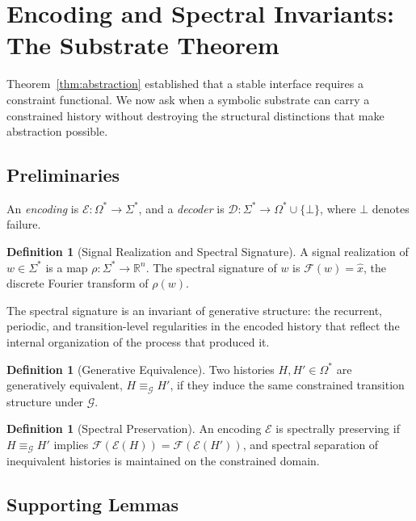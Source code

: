 \documentclass[12pt, a4paper]{article}
\theoremstyle{plain}
\theoremstyle{definition}
\newtheorem{definition}[theorem]{Definition}
\theoremstyle{remark}
\begin{document}
\section{Encoding and Spectral Invariants: The Substrate Theorem}

Theorem~\ref{thm:abstraction} established that a stable interface requires a constraint functional. We now ask when a symbolic substrate can carry a constrained history without destroying the structural distinctions that make abstraction possible.

\subsection{Preliminaries}

An \emph{encoding} is $\mathcal{E} : \Omega^* \to \Sigma^*$, and a \emph{decoder} is $\mathcal{D} : \Sigma^* \to \Omega^* \cup \{\bot\}$, where $\bot$ denotes failure.

\begin{definition}[Signal Realization and Spectral Signature]
A signal realization of $w \in \Sigma^*$ is a map $\rho : \Sigma^* \to \mathbb{R}^n$. The spectral signature of $w$ is $\mathcal{F}(w) = \hat{x}$, the discrete Fourier transform of $\rho(w)$.
\end{definition}

The spectral signature is an invariant of generative structure: the recurrent, periodic, and transition-level regularities in the encoded history that reflect the internal organization of the process that produced it.

\begin{definition}[Generative Equivalence]
Two histories $H, H' \in \Omega^*$ are generatively equivalent, $H \equiv_{\mathcal{G}} H'$, if they induce the same constrained transition structure under $\mathcal{G}$.
\end{definition}

\begin{definition}[Spectral Preservation]
An encoding $\mathcal{E}$ is spectrally preserving if $H \equiv_{\mathcal{G}} H'$ implies $\mathcal{F}(\mathcal{E}(H)) = \mathcal{F}(\mathcal{E}(H'))$, and spectral separation of inequivalent histories is maintained on the constrained domain.
\end{definition}

\subsection{Supporting Lemmas}
\end{document}
